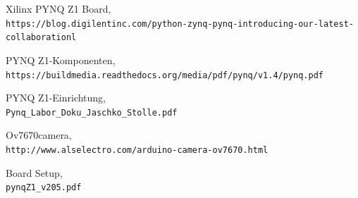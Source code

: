 \documentclass[a4paper]{report}
\begin{document}
\begin{thebibliography}{9}

Xilinx PYNQ Z1 Board,
\\\texttt{https://blog.digilentinc.com/python-zynq-pynq-introducing-our-latest-collaborationl}

PYNQ Z1-Komponenten,
\\\texttt{https://buildmedia.readthedocs.org/media/pdf/pynq/v1.4/pynq.pdf}

PYNQ Z1-Einrichtung,
\\\texttt{Pynq{\_}Labor{\_}Doku{\_}Jaschko{\_}Stolle.pdf}

Ov7670camera,
\\\texttt{http://www.alselectro.com/arduino-camera-ov7670.html}

Board Setup,
\\\texttt{pynqZ1{\_}v205.pdf}


\end{thebibliography}
\end{document}
